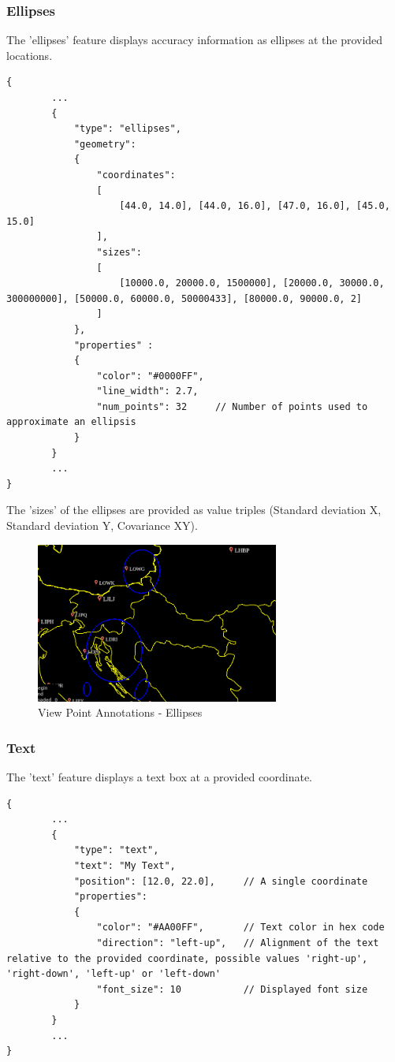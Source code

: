 \subsubsection{Ellipses} The 'ellipses' feature displays accuracy information as ellipses at the provided locations.

\begin{lstlisting}[basicstyle=\small\ttfamily]
{
        ...
        {
            "type": "ellipses",
            "geometry":
            {
                "coordinates": 
                [
                    [44.0, 14.0], [44.0, 16.0], [47.0, 16.0], [45.0, 15.0]
                ],
                "sizes": 
                [
                    [10000.0, 20000.0, 1500000], [20000.0, 30000.0, 300000000], [50000.0, 60000.0, 50000433], [80000.0, 90000.0, 2]
                ]
            },
            "properties" :
            {
                "color": "#0000FF",
                "line_width": 2.7,
                "num_points": 32     // Number of points used to approximate an ellipsis
            }
        }
        ...
}
\end{lstlisting}

The 'sizes' of the ellipses are provided as value triples (Standard deviation X, Standard deviation Y, Covariance XY).

\begin{figure}[H]
    \center
        \includegraphics[width=8cm]{figures/viewpoints_anno_example_ellipses.png}
    \caption{View Point Annotations - Ellipses} 
\end{figure}

\subsubsection{Text} The 'text' feature displays a text box at a provided coordinate.

\begin{lstlisting}[basicstyle=\small\ttfamily]
{
        ...
        {
            "type": "text",
            "text": "My Text",
            "position": [12.0, 22.0],     // A single coordinate
            "properties":
            {
                "color": "#AA00FF",       // Text color in hex code
                "direction": "left-up",   // Alignment of the text relative to the provided coordinate, possible values 'right-up', 'right-down', 'left-up' or 'left-down'
                "font_size": 10           // Displayed font size
            }    
        }
        ...
}
\end{lstlisting}

